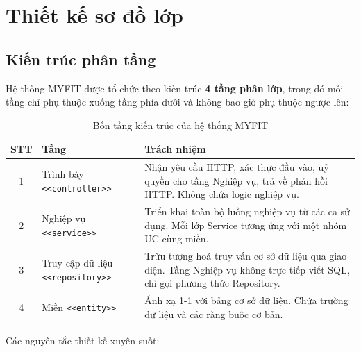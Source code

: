 
\section{Thiết kế sơ đồ lớp}

\subsection{Kiến trúc phân tầng}

Hệ thống MYFIT được tổ chức theo kiến trúc \textbf{4 tầng phân lớp},
trong đó mỗi tầng chỉ phụ thuộc xuống tầng phía dưới và không bao giờ
phụ thuộc ngược lên:

\begin{table}[h]
\centering
\renewcommand{\arraystretch}{1.3}
\begin{tabular}{|c|>{\centering\arraybackslash}m{3cm}|>{\raggedright\arraybackslash}m{8cm}|}
\hline
\textbf{STT} & \textbf{Tầng} & \textbf{Trách nhiệm} \\ \hline
1 & Trình bày \newline \texttt{<<controller>>} &
    Nhận yêu cầu HTTP, xác thực đầu vào, uỷ quyền cho tầng Nghiệp vụ,
    trả về phản hồi HTTP. Không chứa logic nghiệp vụ. \\ \hline
2 & Nghiệp vụ \newline \texttt{<<service>>} &
    Triển khai toàn bộ luồng nghiệp vụ từ các ca sử dụng. Mỗi
    lớp Service tương ứng với một nhóm UC cùng miền. \\ \hline
3 & Truy cập dữ liệu \newline \texttt{<<repository>>} &
    Trừu tượng hoá truy vấn cơ sở dữ liệu qua giao diện.
    Tầng Nghiệp vụ không trực tiếp viết SQL, chỉ gọi phương thức Repository. \\ \hline
4 & Miền \newline \texttt{<<entity>>} &
    Ánh xạ 1-1 với bảng cơ sở dữ liệu. Chứa trường dữ liệu
    và các ràng buộc cơ bản. \\ \hline
\end{tabular}
\caption{Bốn tầng kiến trúc của hệ thống MYFIT}
\end{table}

\noindent Các nguyên tắc thiết kế xuyên suốt:

